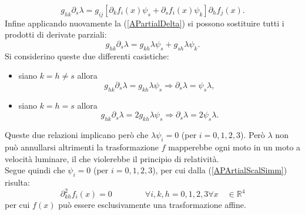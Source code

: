 \begin{equation}
    g_{hk} \partial_s\lambda =g_{ij} \left[\partial_kf_i(x)\psi_s+\partial_sf_i(x)\psi_k\right]\partial_hf_j(x).
\end{equation}    
Infine applicando nuovamente la (\ref{APartialDelta}) si possono sostituire tutti i prodotti di derivate parziali:
\begin{equation*}
    g_{hk} \partial_s\lambda =g_{kh}\lambda\psi_s+g_{sh}\lambda \psi_k.
\end{equation*}
Si considerino queste due differenti casistiche:
\begin{itemize}
    \item siano $k=h\neq s$ allora
    \begin{equation*}
        g_{hk} \partial_s\lambda =g_{kh}\lambda\psi_s \Rightarrow \partial_s\lambda=\psi_s\lambda,
    \end{equation*}
    \item siano $k=h= s$ allora
    \begin{equation*}
        g_{hk} \partial_s\lambda =2g_{kh}\lambda\psi_s \Rightarrow \partial_s\lambda=2\psi_s\lambda.
    \end{equation*}
\end{itemize}
Queste due relazioni implicano però che $\lambda\psi_i=0$ (per $i=0,1,2,3$). Però $\lambda$  non può annullarsi altrimenti la trasformazione $f$ mapperebbe ogni moto in un moto a velocità luminare, il che violerebbe il principio di relatività.\\Segue quindi che $\psi_i=0$ (per $i=0,1,2,3$), per cui dalla (\ref{APArtialScalSimm}) risulta:
\begin{equation}
    \partial_{kh}^2f_i(x)=0 \qquad \qquad \forall i,k,h=0,1,2,3 \forall x \quad\in \mathbb{R}^4
\end{equation}
per cui $f(x)$ può essere esclusivamente una trasformazione affine.
